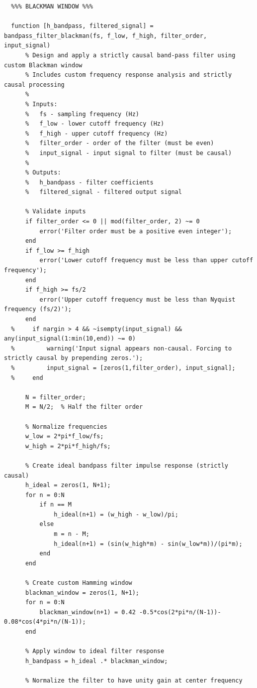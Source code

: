 \documentclass[12pt]{report}
\begin{document}
\begin{lstlisting}
  %%% BLACKMAN WINDOW %%%

  function [h_bandpass, filtered_signal] = bandpass_filter_blackman(fs, f_low, f_high, filter_order, input_signal)
      % Design and apply a strictly causal band-pass filter using custom Blackman window
      % Includes custom frequency response analysis and strictly causal processing
      %
      % Inputs:
      %   fs - sampling frequency (Hz)
      %   f_low - lower cutoff frequency (Hz)
      %   f_high - upper cutoff frequency (Hz)
      %   filter_order - order of the filter (must be even)
      %   input_signal - input signal to filter (must be causal)
      %
      % Outputs:
      %   h_bandpass - filter coefficients
      %   filtered_signal - filtered output signal
      
      % Validate inputs
      if filter_order <= 0 || mod(filter_order, 2) ~= 0
          error('Filter order must be a positive even integer');
      end
      if f_low >= f_high
          error('Lower cutoff frequency must be less than upper cutoff frequency');
      end
      if f_high >= fs/2
          error('Upper cutoff frequency must be less than Nyquist frequency (fs/2)');
      end
  %     if nargin > 4 && ~isempty(input_signal) && any(input_signal(1:min(10,end)) ~= 0)
  %         warning('Input signal appears non-causal. Forcing to strictly causal by prepending zeros.');
  %         input_signal = [zeros(1,filter_order), input_signal];
  %     end
      
      N = filter_order;
      M = N/2;  % Half the filter order
      
      % Normalize frequencies
      w_low = 2*pi*f_low/fs;
      w_high = 2*pi*f_high/fs;
      
      % Create ideal bandpass filter impulse response (strictly causal)
      h_ideal = zeros(1, N+1);
      for n = 0:N
          if n == M
              h_ideal(n+1) = (w_high - w_low)/pi;
          else
              m = n - M;
              h_ideal(n+1) = (sin(w_high*m) - sin(w_low*m))/(pi*m);
          end
      end
      
      % Create custom Hamming window
      blackman_window = zeros(1, N+1);
      for n = 0:N
          blackman_window(n+1) = 0.42 -0.5*cos(2*pi*n/(N-1))- 0.08*cos(4*pi*n/(N-1));
      end
      
      % Apply window to ideal filter response
      h_bandpass = h_ideal .* blackman_window;
      
      % Normalize the filter to have unity gain at center frequency
      

\end{lstlisting}
\end{document}
